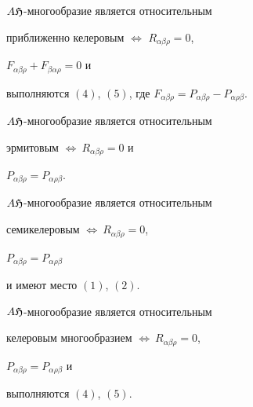  


\begin{thm} $A\frak H$-многообразие является относительным 


приближенно келеровым $\Longleftrightarrow$ $R_{\alpha\beta\rho}=0$, 


$F_{\alpha\beta\rho}+F_{\beta\alpha\rho}=0$ и 


выполняются $(4)$, $(5)$, где $F_{\alpha\beta\rho}=P_{\alpha\beta\rho}- 


P_{\alpha\rho\beta}$. 


\end{thm} 


 


\begin{thm} $A\frak H$-многообразие является относительным 


эрмитовым $\Longleftrightarrow\ R_{\alpha\beta\rho}=0$ и 


$P_{\alpha\beta\rho}=P_{\alpha\rho\beta}$. 


\end{thm} 


 


\begin{thm} $A\frak H$-многообразие является относительным 


семикелеровым $\Longleftrightarrow\ R_{\alpha\beta\rho}=0$, 


$P_{\alpha\beta\rho}=P_{\alpha\rho\beta}$ 


и имеют место $(1)$, $(2)$.  


\end{thm} 


 


\begin{thm} $A\frak H$-многообразие является относительным 


келеровым многообразием $\Longleftrightarrow\ R_{\alpha\beta\rho}=0$, 


$P_{\alpha\beta\rho}=P_{\alpha\rho\beta}$ и 


выполняются $(4)$, $(5)$. 


\end{thm} 


 


